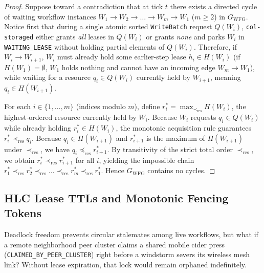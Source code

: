 \begin{proof}
Suppose toward a contradiction that at tick $t$ there exists a directed cycle of waiting
workflow instances $W_1 \to W_2 \to \dots \to W_m \to W_1$ ($m \ge 2$) in
$G_{\mathrm{WFG}}$. Notice first that during a single atomic sorted \texttt{WriteBatch}
request $Q(W_i)$, \texttt{col-storaged} either grants \textit{all} leases in $Q(W_i)$ or
grants \textit{none} and parks $W_i$ in \texttt{WAITING\_LEASE} without holding partial
elements of $Q(W_i)$. Therefore, if $W_i \to W_{i+1}$, $W_i$ must already hold some
earlier-step lease $h_i \in H(W_i)$ (if $H(W_1) = \emptyset$, $W_1$ holds nothing and cannot
have an incoming edge $W_m \to W_1$), while waiting for a resource $q_i \in Q(W_i)$
currently held by $W_{i+1}$, meaning $q_i \in H(W_{i+1})$.

For each $i \in \{1, \dots, m\}$ (indices modulo $m$), define $r_i^{*} = \max_{\prec_{\mathrm{res}}} H(W_i)$,
the highest-ordered resource currently held by $W_i$. Because $W_i$ requests $q_i \in Q(W_i)$
while already holding $r_i^{*} \in H(W_i)$, the monotonic acquisition rule guarantees
$r_i^{*} \prec_{\mathrm{res}} q_i$. Because $q_i \in H(W_{i+1})$ and $r_{i+1}^{*}$ is the
maximum of $H(W_{i+1})$ under $\prec_{\mathrm{res}}$, we have $q_i \preceq_{\mathrm{res}} r_{i+1}^{*}$.
By transitivity of the strict total order $\prec_{\mathrm{res}}$, we obtain $r_i^{*} \prec_{\mathrm{res}} r_{i+1}^{*}$
for all $i$, yielding the impossible chain $r_1^{*} \prec_{\mathrm{res}} r_2^{*} \prec_{\mathrm{res}} \dots \prec_{\mathrm{res}} r_m^{*} \prec_{\mathrm{res}} r_1^{*}$.
Hence $G_{\mathrm{WFG}}$ contains no cycles.
\end{proof}

\subsection{HLC Lease TTLs and Monotonic Fencing Tokens}

Deadlock freedom prevents circular stalemates among live workflows, but what if a remote
neighborhood peer cluster claims a shared mobile cider press
(\texttt{CLAIMED\_BY\_PEER\_CLUSTER}) right before a windstorm severs its wireless mesh
link? Without lease expiration, that lock would remain orphaned indefinitely.

